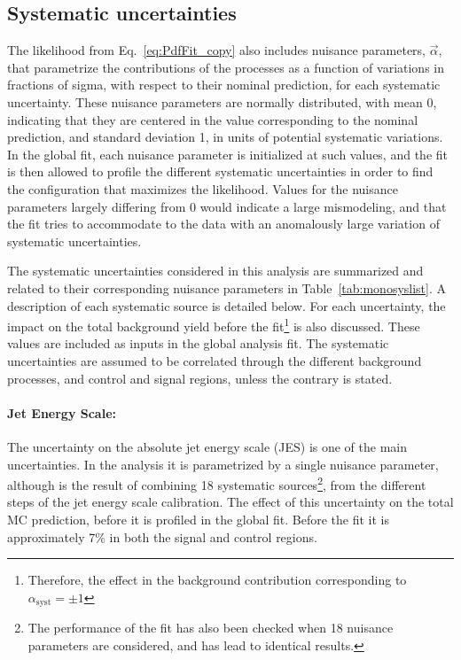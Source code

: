 \subsection{Systematic uncertainties}
    \label{subsec:MonojetSystematicUncertainties}

The likelihood from Eq.~\ref{eq:PdfFit_copy} also includes nuisance parameters, $\vec{\alpha}$, that parametrize the contributions of the processes as a function of variations in fractions of sigma, with respect to their nominal prediction, for each systematic uncertainty.
These nuisance parameters are normally distributed, with mean 0, indicating that they are centered in the value corresponding to the nominal prediction, and standard deviation 1, in units of potential systematic variations.
In the global fit, each nuisance parameter is initialized at such values, and the fit is then allowed to profile the different systematic uncertainties in order to find the configuration that maximizes the likelihood.
Values for the nuisance parameters largely differing from 0 would indicate a large mismodeling, and that the fit tries to accommodate to the data with an anomalously large variation of systematic uncertainties.

The systematic uncertainties considered in this analysis are summarized and related to their corresponding nuisance parameters in Table~\ref{tab:monosyslist}.
A description of each systematic source is detailed below.
For each uncertainty, the impact on the total background yield before the fit\footnote{Therefore, the effect in the background contribution corresponding to $\alpha_\text{syst} = \pm 1$} is also discussed.
These values are included as inputs in the global analysis fit.
The systematic uncertainties are assumed to be correlated through the different background processes, and control and signal regions, unless the contrary is stated.



\paragraph{Jet Energy Scale:} The uncertainty on the absolute jet energy scale (JES) is one of the main uncertainties.
In the analysis it is parametrized by a single nuisance parameter, although is the result of combining 18 systematic sources\footnote{The performance of the fit has also been checked when 18 nuisance parameters are considered, and has lead to identical results.}, from the different steps of the jet energy scale calibration.
The effect of this uncertainty on the total MC prediction, before it is profiled in the global fit.
Before the fit it is approximately 7\% in both the signal and control regions.

